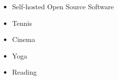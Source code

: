 %
%
%


\vspace{-1em}
\twocolumnsection
{
	\vspace{-0.6em}
	\begin{skills}
	\end{skills}}
{
	\vspace{0.7em}
	\begin{itemize}
		\item Self-hosted Open Source Software
		\item Tennis
		\item Cinema
		\item Yoga
		\item Reading
	\end{itemize}
}